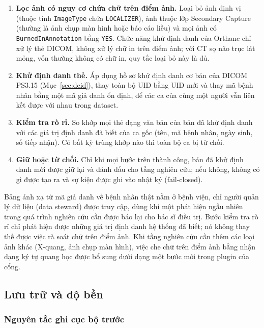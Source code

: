 \begin{enumerate}[leftmargin=1.2cm]
\item \textbf{Lọc ảnh có nguy cơ chứa chữ trên điểm ảnh.} Loại bỏ ảnh định vị (thuộc
      tính \texttt{ImageType} chứa \texttt{LOCALIZER}), ảnh thuộc lớp Secondary Capture
      (thường là ảnh chụp màn hình hoặc báo cáo liều) và mọi ảnh có
      \texttt{BurnedInAnnotation} bằng \texttt{YES}. Chức năng khử định danh của Orthanc
      chỉ xử lý thẻ DICOM, không xử lý chữ in trên điểm ảnh; với CT sọ não trục lát mỏng,
      vốn thường không có chữ in, quy tắc loại bỏ này là đủ.
\item \textbf{Khử định danh thẻ.} Áp dụng hồ sơ khử định danh cơ bản của DICOM PS3.15
      (Mục~\ref{sec:deid}), thay toàn bộ UID bằng UID mới và thay mã bệnh nhân bằng một
      mã giả danh ổn định, để các ca của cùng một người vẫn liên kết được với nhau trong
      dataset.
\item \textbf{Kiểm tra rò rỉ.} So khớp mọi thẻ dạng văn bản của bản đã khử định danh
      với các giá trị định danh đã biết của ca gốc (tên, mã bệnh nhân, ngày sinh, số tiếp
      nhận). Có bất kỳ trùng khớp nào thì toàn bộ ca bị từ chối.
\item \textbf{Giữ hoặc từ chối.} Chỉ khi mọi bước trên thành công, bản đã khử định danh
      mới được giữ lại và đánh dấu cho tầng nghiên cứu; nếu không, không có gì được tạo ra
      và sự kiện được ghi vào nhật ký (fail-closed).
\end{enumerate}

Bảng ánh xạ từ mã giả danh về bệnh nhân thật nằm ở bệnh viện, chỉ người quản lý dữ liệu
(data steward) được truy cập, dùng khi một phát hiện ngẫu nhiên trong quá trình nghiên
cứu cần được báo lại cho bác sĩ điều trị. Bước kiểm tra rò rỉ chỉ phát hiện được những
giá trị định danh hệ thống đã biết; nó không thay thế được việc rà soát chữ trên điểm
ảnh. Khi tầng nghiên cứu cần thêm các loại ảnh khác (X-quang, ảnh chụp màn hình), việc
che chữ trên điểm ảnh bằng nhận dạng ký tự quang học được bổ sung dưới dạng một bước mới
trong plugin của cổng.

\subsection{Lưu trữ và độ bền}
\label{sec:storage}

\subsubsection{Nguyên tắc ghi cục bộ trước}
\label{sec:localfirst}

